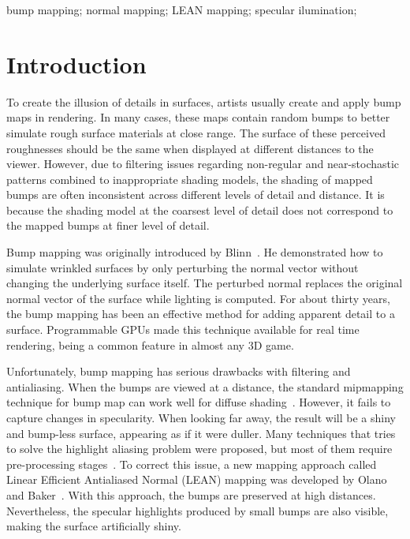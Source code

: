 \documentclass[10pt, conference]{IEEEtran}
\begin{document}
\begin{IEEEkeywords}
bump mapping; normal mapping; LEAN mapping; specular ilumination;

\end{IEEEkeywords}


\IEEEpeerreviewmaketitle





\section{Introduction}
%
To create the illusion of details in surfaces, artists usually create and apply bump maps in rendering. In many cases, these maps contain random bumps to better simulate rough surface materials at close range. The surface of these perceived roughnesses should be the same when displayed at different distances to the viewer. However, due to filtering issues regarding non-regular and near-stochastic patterns combined to inappropriate shading models, the shading of mapped bumps are often inconsistent across different levels of detail and distance. It is because the shading model at the coarsest level of detail does not correspond to the mapped bumps at finer level of detail.

Bump mapping was originally introduced by Blinn~\cite{Blinn:1978:SWS:800248.507101}. He demonstrated how to simulate wrinkled surfaces by only perturbing the normal vector without changing the underlying surface itself. The perturbed normal replaces the original normal vector of the surface while lighting is computed. For about thirty years, the bump mapping has been an effective method for adding apparent detail to a surface. Programmable GPUs made this technique available for real time rendering, being a common feature in almost any 3D game.

Unfortunately, bump mapping has serious drawbacks with filtering and antialiasing. When the bumps are viewed at a distance, the standard mipmapping technique for bump map can work well for diffuse shading~\cite{Kilgard00apractical}. However, it fails to capture changes in specularity. When looking far away, the result will be a shiny and bump-less surface, appearing as if it were duller. Many techniques that tries to solve the highlight aliasing problem were proposed, but most of them require pre-processing stages~\cite{Cabral:1987:BRF:37401.37434, Becker:1993:STB:166117.166141, Westin:1992:PRF:133994.134075}. To correct this issue, a new mapping approach called Linear Efficient Antialiased Normal (LEAN) mapping was developed by Olano and Baker~\cite{Olano:2010:LM:1730804.1730834}. With this approach, the bumps are preserved at high distances. Nevertheless, the specular highlights produced by small bumps are also visible, making the surface artificially shiny.
\end{document}
